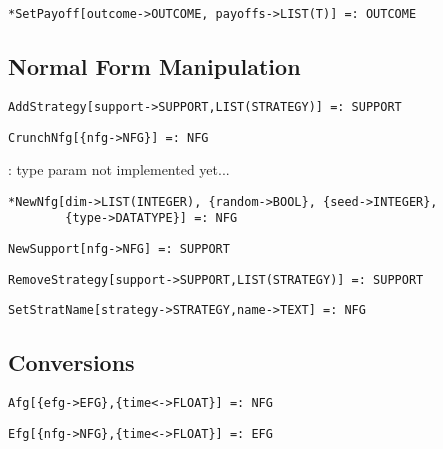 \protect \large \begin{verbatim}
*SetPayoff[outcome->OUTCOME, payoffs->LIST(T)] =: OUTCOME
\end{verbatim}\normalsize

\medskip
\subsection{Normal Form Manipulation}

\protect \large \begin{verbatim}
AddStrategy[support->SUPPORT,LIST(STRATEGY)] =: SUPPORT
\end{verbatim}\normalsize

\protect \large \begin{verbatim}
CrunchNfg[{nfg->NFG}] =: NFG
\end{verbatim}\normalsize

: type param not implemented yet...
\protect \large \begin{verbatim}
*NewNfg[dim->LIST(INTEGER), {random->BOOL}, {seed->INTEGER},
        {type->DATATYPE}] =: NFG
\end{verbatim}\normalsize

\protect \large \begin{verbatim}
NewSupport[nfg->NFG] =: SUPPORT
\end{verbatim}\normalsize

\protect \large \begin{verbatim}
RemoveStrategy[support->SUPPORT,LIST(STRATEGY)] =: SUPPORT
\end{verbatim}\normalsize

\protect \large \begin{verbatim}
SetStratName[strategy->STRATEGY,name->TEXT] =: NFG
\end{verbatim}\normalsize

\medskip
\subsection{Conversions}


\protect \large \begin{verbatim}
Afg[{efg->EFG},{time<->FLOAT}] =: NFG
\end{verbatim}\normalsize


\protect \large \begin{verbatim}
Efg[{nfg->NFG},{time<->FLOAT}] =: EFG
\end{verbatim}\normalsize


